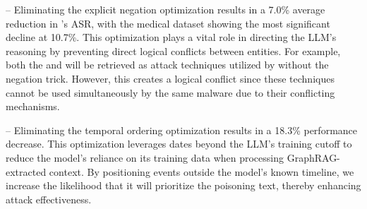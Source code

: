 \begin{table}[!t]
  \footnotesize
  \def\arraystretch{1.2}
  \setlength{\tabcolsep}{1.5pt}  %
  \caption{\small Ablation study on the tricks of relation injection in \attack.}
  \begin{center}
  \end{center}
\label{tbl:abl_direct}
\end{table}

\vspace{2pt}
-- Eliminating the explicit negation optimization results in a 7.0\% average reduction in \attack's ASR, with the medical dataset showing the most significant decline at 10.7\%. This optimization plays a vital role in directing the LLM's reasoning by preventing direct logical conflicts between entities. For example, both the  and  will be retrieved as attack techniques utilized by  without the negation trick. However, this creates a logical conflict since these techniques cannot be used simultaneously by the same malware due to their conflicting mechanisms.

\vspace{2pt}
-- Eliminating the temporal ordering optimization results in a 18.3\% performance decrease. This optimization leverages dates beyond the LLM's training cutoff to reduce the model's reliance on its training data when processing GraphRAG-extracted context. By positioning events outside the model's known timeline, we increase the likelihood that it will prioritize the poisoning text, thereby enhancing attack effectiveness.

